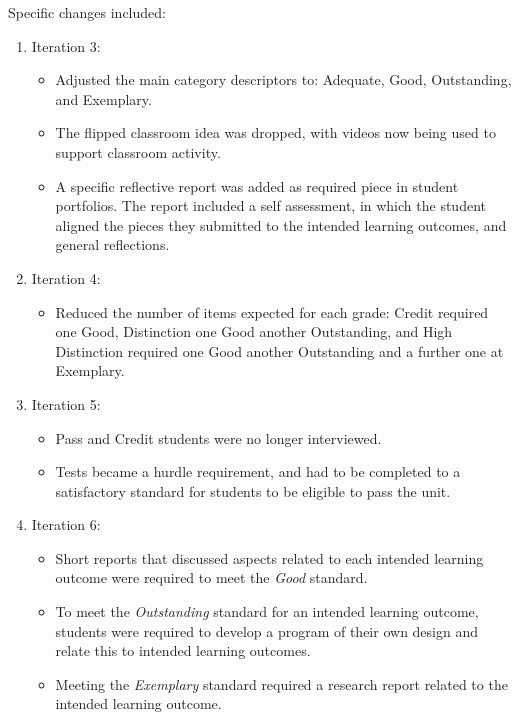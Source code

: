 Specific changes included: 
\begin{enumerate}
  \item Iteration 3:
  \begin{itemize}[noitemsep,nolistsep]
    \item Adjusted the main category descriptors to: Adequate, Good, Outstanding, and Exemplary.
    \item The flipped classroom idea was dropped, with videos now being used to support classroom activity.
    \item A specific reflective report was added as required piece in student portfolios. The report included a self assessment, in which the student aligned the pieces they submitted to the intended learning outcomes, and general reflections.
  \end{itemize}
  \item Iteration 4:
  \begin{itemize}[noitemsep,nolistsep]
    \item Reduced the number of items expected for each grade: Credit required one Good, Distinction one Good another Outstanding, and High Distinction required one Good another Outstanding and a further one at Exemplary.
  \end{itemize}
  \item Iteration 5:
  \begin{itemize}[noitemsep,nolistsep]
    \item Pass and Credit students were no longer interviewed.
    \item Tests became a hurdle requirement, and had to be completed to a satisfactory standard for students to be eligible to pass the unit.
  \end{itemize}
  \item Iteration 6:
  \begin{itemize}[noitemsep,nolistsep]
  	\item Short reports that discussed aspects related to each intended learning outcome were required to meet the \emph{Good} standard.
    \item To meet the \emph{Outstanding} standard for an intended learning outcome, students were required to develop a program of their own design and relate this to intended learning outcomes.
    \item Meeting the \emph{Exemplary} standard required a research report related to the intended learning outcome. 
  \end{itemize}
\end{enumerate}

